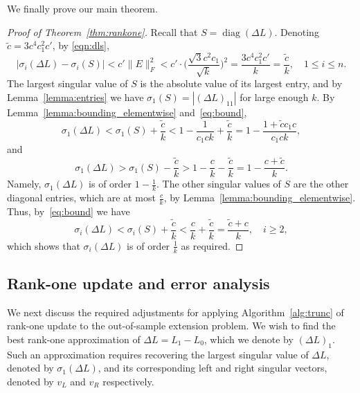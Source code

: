 \documentclass[11pt]{article}
\begin{document}
We finally prove our main theorem.
\begin{proof}[Proof of Theorem~\ref{thm:rankone}]
Recall that $S = \operatorname{diag}(\Delta L)$. Denoting $ \tilde{c} = 3c^4c_1^2c'$, by \eqref{eqn:dls}, 
\begin{equation} \label{eq:bound}
|\sigma_i(\Delta L) - \sigma_i(S)| < c' \|E\|_F^2 < c' \cdot \Bigg( \frac{\sqrt{3}c^2c_1}{\sqrt{k}}  \Bigg)^2 = \frac{3c^4c_1^2c'}{k} =   \frac{\widetilde{c}}{k} , \quad 1 \leq i \leq n .
\end{equation}
The largest singular value of $S$ is the absolute value of its largest entry, and by Lemma~\ref{lemma:entries} we have $\sigma_1 (S) = |(\Delta L)_{11}| $ for large enough $k$. By Lemma~\ref{lemma:bounding_elementwise} and~\eqref{eq:bound},
\begin{equation}
\sigma_1 (\Delta L) < \sigma_1 (S) +  \frac{\widetilde{c}}{k} < 1 - \frac{1}{c_1ck} + \frac{\widetilde{c}}{k} = 1 - \frac{1 + \widetilde{c}c_1c}{c_1ck} ,
\end{equation}
and
\begin{equation}
\sigma_1 (\Delta L) > \sigma_1 (S) - \frac{\widetilde{c}}{k} > 1 - \frac{c}{k} - \frac{\widetilde{c}}{k} = 1 - \frac{c + \widetilde{c}}{k} .
\end{equation}
Namely,  $\sigma_1(\Delta L)$ is of order $1 - \frac{1}{k}$. The other singular values of $S$ are the other diagonal entries, which are at most $\frac{c}{k}$, by Lemma~\ref{lemma:bounding_elementwise}. Thus, by~\eqref{eq:bound} we have\begin{equation}
\sigma_i (\Delta L) < \sigma_i (S) +  \frac{\widetilde{c}}{k} < \frac{c}{k} + \frac{\widetilde{c}}{k} =  \frac{ \widetilde{c} + c}{k} , \quad i \geq 2 ,
\end{equation}
which shows that $\sigma_i (\Delta L)$ is of order $\frac{1}{k}$ as required.
\end{proof}

\subsection{Rank-one update and error analysis} \label{sec:alg_gl}

We next discuss the required adjustments for applying Algorithm~\ref{alg:trunc} of rank-one update to the out-of-sample extension problem. We wish to find the best rank-one approximation of $\Delta L = L_1 - L_0$, which we denote by $(\Delta L)_1$. Such an approximation requires recovering the largest singular value of $\Delta L$, denoted by $\sigma_1(\Delta L)$, and its corresponding left and right singular vectors, denoted by $v_L$ and $v_R$ respectively. 
\end{document}
